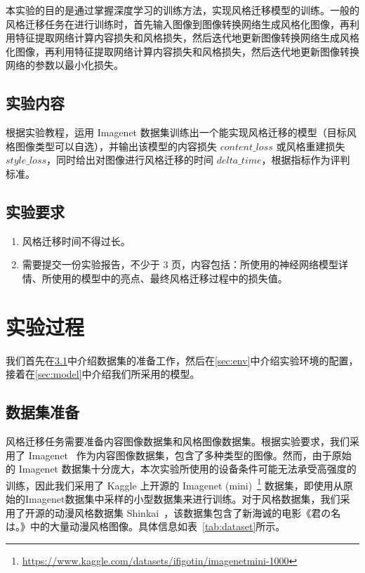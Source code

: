 \documentclass[UTF8,openany]{ctexbook}
\begin{document}
本实验的目的是通过掌握深度学习的训练方法，实现风格迁移模型的训练。一般的风格迁移任务在进行训练时，首先输入图像到图像转换网络生成风格化图像，再利用特征提取网络计算内容损失和风格损失，然后迭代地更新图像转换网络生成风格化图像，再利用特征提取网络计算内容损失和风格损失，然后迭代地更新图像转换网络的参数以最小化损失。

\section{实验内容}

根据实验教程，运用 Imagenet 数据集训练出一个能实现风格迁移的模型（目标风格图像类型可以自选），并输出该模型的内容损失 $content\_loss$ 或风格重建损失 $style\_loss$，同时给出对图像进行风格迁移的时间 $delta\_time$，根据指标作为评判标准。

\section{实验要求}

\begin{enumerate}
    \item 风格迁移时间不得过长。
    \item 需要提交一份实验报告，不少于 3 页，内容包括：所使用的神经网络模型详情、所使用的模型中的亮点、最终风格迁移过程中的损失值。
\end{enumerate}

\chapter{实验过程}

我们首先在\textsection\ref{sec:dataset}中介绍数据集的准备工作，然后在\textsection\ref{sec:env}中介绍实验环境的配置，接着在\textsection\ref{sec:model}中介绍我们所采用的模型。

\section{数据集准备}
\label{sec:dataset}

风格迁移任务需要准备内容图像数据集和风格图像数据集。根据实验要求，我们采用了 Imagenet~\cite{deng2009imagenet} 作为内容图像数据集，包含了多种类型的图像。然而，由于原始的 Imagenet 数据集十分庞大，本次实验所使用的设备条件可能无法承受高强度的训练，因此我们采用了 Kaggle 上开源的 Imagenet (mini)~\footnote{\url{https://www.kaggle.com/datasets/ifigotin/imagenetmini-1000}} 数据集，即使用从原始的Imagenet数据集中采样的小型数据集来进行训练。对于风格数据集，我们采用了开源的动漫风格数据集 Shinkai~\cite{Liu2024dtgan}，该数据集包含了新海诚的电影《君の名は。》中的大量动漫风格图像。具体信息如表~\ref{tab:dataset}所示。
\end{document}

